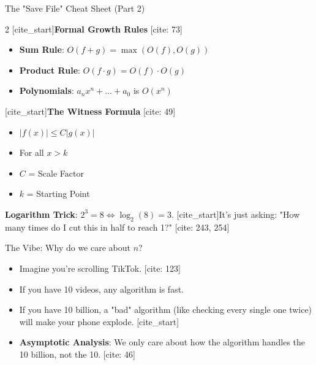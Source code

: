 \documentclass[landscape]{beamer}
\begin{document}
\begin{frame}{The "Save File" Cheat Sheet (Part 2)}
    \begin{multicols}{2}
        [cite_start]\textbf{Formal Growth Rules} [cite: 73]
        \begin{itemize}
            \item \textbf{Sum Rule}: $O(f + g) = \max(O(f), O(g))$
            \item \textbf{Product Rule}: $O(f \cdot g) = O(f) \cdot O(g)$
            \item \textbf{Polynomials}: $a_n x^n + \dots + a_0$ is $O(x^n)$
        \end{itemize}
        
        \columnbreak
        
        [cite_start]\textbf{The Witness Formula} [cite: 49]
        \begin{itemize}
            \item $|f(x)| \le C |g(x)|$
            \item For all $x > k$
            \item $C$ = Scale Factor
            \item $k$ = Starting Point
        \end{itemize}
    \end{multicols}
    \textbf{Logarithm Trick}: $2^3 = 8 \iff \log_2(8) = 3$. [cite_start]It's just asking: "How many times do I cut this in half to reach 1?" [cite: 243, 254]
\end{frame}

\begin{frame}{The Vibe: Why do we care about $n$?}
    \begin{itemize}
        [cite_start]\item Imagine you're scrolling TikTok. [cite: 123]
        \item If you have 10 videos, any algorithm is fast.
        \item If you have 10 billion, a "bad" algorithm (like checking every single one twice) will make your phone explode.
        [cite_start]\item \textbf{Asymptotic Analysis}: We only care about how the algorithm handles the 10 billion, not the 10. [cite: 46]
    \end{itemize}
    \end{frame}
\end{document}

